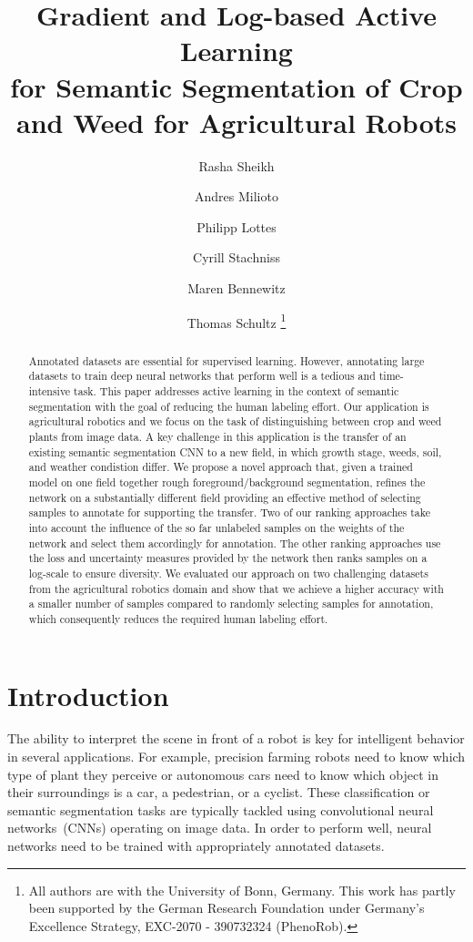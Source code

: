 \documentclass[letterpaper, 10 pt, conference]{ieeeconf}  %
\title{\LARGE \bf Gradient and Log-based Active Learning\\ for Semantic Segmentation of Crop and Weed for Agricultural Robots}
\author{Rasha Sheikh \and Andres Milioto \and Philipp Lottes \and Cyrill Stachniss \and Maren Bennewitz \and Thomas Schultz%
  \thanks{All authors are with the University of
    Bonn, Germany. This work has partly been supported by the German Research Foundation under Germany's Excellence Strategy, EXC-2070 - 390732324 (PhenoRob).}%
}
\begin{document}
\maketitle
\thispagestyle{empty} 
\pagestyle{empty}


\begin{abstract}
Annotated datasets are essential for supervised learning. However, annotating
large datasets to  train deep neural networks that perform well is a tedious
and time-intensive task. This paper  addresses active learning in the context
of semantic segmentation with the goal of reducing the  human labeling effort.
Our application is agricultural robotics  and we focus on the task of
distinguishing between crop and weed plants from image data. A key challenge in this
application is the  transfer of an existing semantic segmentation CNN to a new
field, in which growth stage, weeds, soil, and weather condistion differ. 
We propose a novel approach that, given a trained model on one field together
 rough foreground/background segmentation,
refines the network on a substantially different field  providing an effective
method of selecting samples to annotate for supporting the transfer. Two of our ranking approaches take
 into account the influence of the so far unlabeled samples on the
weights of the network and select them accordingly for annotation. The other ranking approaches 
use the loss and uncertainty measures provided by the network then ranks samples on a log-scale to ensure diversity.
We evaluated our approach on two challenging  datasets from the agricultural
robotics domain and show that we achieve a higher accuracy with a  smaller
number of samples compared to randomly selecting samples for annotation, which consequently reduces the required human labeling  effort.

\end{abstract} 

\section{Introduction}
\label{sec:intro}

The ability to  interpret the scene in front of a robot is key for
intelligent behavior in several applications. For example, precision farming
robots need to know which type of plant they perceive or autonomous cars need to
know  which object in their surroundings is a car, a pedestrian, or a
cyclist. These  classification or semantic segmentation tasks are typically
tackled using  convolutional neural networks~(CNNs) operating on  image data.
In order to perform  well, neural networks need to be trained with
appropriately annotated datasets.
\end{document}
